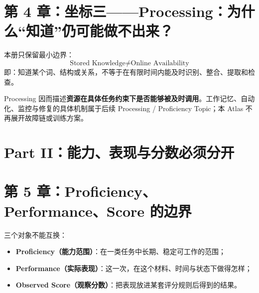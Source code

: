 \documentclass[11pt,a4paper]{ctexart}
\newcommand{\kw}[1]{\textbf{#1}}
\newcommand{\term}[2]{\textbf{#1（#2）}}
\begin{document}
\section{第 4 章：坐标三——Processing：为什么“知道”仍可能做不出来？}

本册只保留最小边界：
\[
\boxed{\text{Stored Knowledge} \neq \text{Online Availability}}
\]
即：知道某个词、结构或关系，不等于在有限时间内能及时识别、整合、提取和检查。

Processing 因而描述\kw{资源在具体任务约束下是否能够被及时调用}。工作记忆、自动化、监控与修复的具体机制属于后续 Processing / Proficiency Topic；本 Atlas 不再展开故障链或训练方案。

\newpage
\section{Part II：能力、表现与分数必须分开}

\section{第 5 章：Proficiency、Performance、Score 的边界}

\begin{center}
\end{center}

三个对象不能互换：
\begin{itemize}
  \item \term{Proficiency}{能力范围}：在一类任务中长期、稳定可工作的范围；
  \item \term{Performance}{实际表现}：这一次，在这个材料、时间与状态下做得怎样；
  \item \term{Observed Score}{观察分数}：把表现放进某套评分规则后得到的结果。
\end{itemize}
\end{document}
